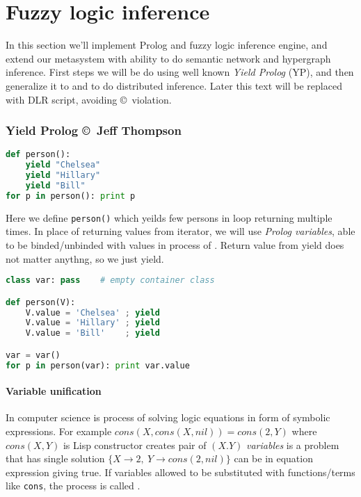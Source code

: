 \part{Fuzzy logic inference}\label{inference}

\noindent
In this section we'll implement Prolog and fuzzy logic inference engine, and
extend our metasystem with ability to do semantic network and hypergraph
inference.
First steps we will be do using well known \emph{Yield
Prolog} (YP), and then generalize it to  and
 to do distributed inference. Later this text will be
replaced with DLR script, avoiding \copyright\ violation.

\section{Yield Prolog \copyright\ Jeff Thompson}

\begin{lstlisting}[language=Python]
def person():
    yield "Chelsea"
    yield "Hillary"
    yield "Bill"
for p in person(): print p
\end{lstlisting}
Here we define \verb|person()|  which yeilds few
persons in loop returning  multiple times. In place of
returning values from iterator, we will use \emph{Prolog variables}, able to be
binded/unbinded with values in process of . Return value from
yield does not matter anythng, so we just yield.

\begin{lstlisting}[language=Python]
class var: pass    # empty container class

def person(V):
    V.value = 'Chelsea' ; yield
    V.value = 'Hillary' ; yield
    V.value = 'Bill'	; yield

var = var()
for p in person(var): print var.value
\end{lstlisting}

\subsection{Variable unification}

In computer science  is process of solving logic equations in
form of symbolic expressions. For example $cons(X,cons(X,nil)) = cons(2,Y)$
where $cons(X,Y)$ is Lisp constructor creates pair of $(X.Y)$ \emph{variables}
is a  problem that has single solution
$\{X\rightarrow 2,\ Y\rightarrow cons(2,nil)\}$ can be  in
equation expression giving true. If variables allowed to be substituted with
functions/terms like \verb|cons|, the process is called .

